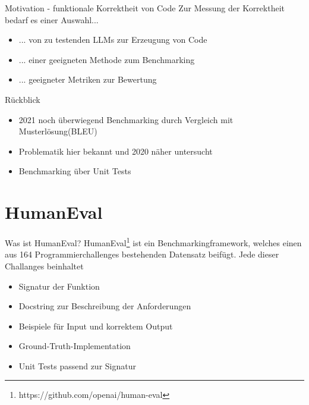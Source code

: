 \documentclass{beamer}              %
\begin{document}
\begin{frame}{Motivation - funktionale Korrektheit von Code}
Zur Messung der Korrektheit bedarf es einer Auswahl...
\begin{itemize}
    \item ... von zu testenden LLMs zur Erzeugung von Code
    \item ... einer geeigneten Methode zum Benchmarking
    \item ... geeigneter Metriken zur Bewertung
\end{itemize}
\end{frame}

\begin{frame}{Rückblick}
\begin{itemize}
    \item 2021 noch überwiegend Benchmarking durch Vergleich mit Musterlösung(BLEU)\cite{chen2021evaluating}
    \item Problematik hier bekannt und 2020 näher untersucht\cite{ren2020codebleu}
    \item Benchmarking über Unit Tests\cite{osti_10195511}\cite{chen2021evaluating}
\end{itemize}
\end{frame}

\section{HumanEval}
\begin{frame}{Was ist HumanEval?}
HumanEval\footnote{https://github.com/openai/human-eval} ist ein Benchmarkingframework, welches einen aus 164 Programmierchallenges bestehenden Datensatz beifügt\cite{chen2021evaluating}. Jede dieser Challanges beinhaltet
\begin{itemize}
    \item Signatur der Funktion
    \item Docstring zur Beschreibung der Anforderungen
    \item Beispiele für Input und korrektem Output
    \item Ground-Truth-Implementation
    \item Unit Tests passend zur Signatur
\end{itemize}
\end{frame}
\end{document}
